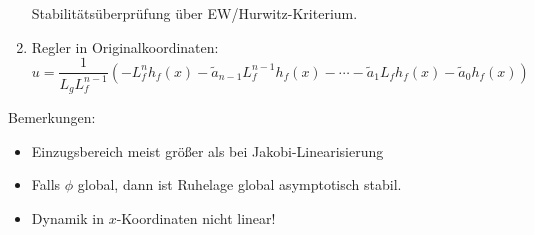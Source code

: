 \begin{enumerate}
        Stabilitätsüberprüfung über EW/Hurwitz-Kriterium.
    \item
        Regler in Originalkoordinaten:
        \begin{equation}
            u = \frac{1}{L_g L_f^{n-1}} (-L_f^n h_f(x) 
            - \tilde{a}_{n-1} L_f^{n-1} h_f(x) - \cdots - \tilde{a}_1 L_f h_f(x)
            - \tilde{a}_0 h_f(x))
        \end{equation}
\end{enumerate}

Bemerkungen:
\begin{itemize}
    \item
        Einzugsbereich meist größer als bei Jakobi-Linearisierung
    \item
        Falls $\phi$ global, dann ist Ruhelage global asymptotisch stabil.
    \item 
        Dynamik in $x$-Koordinaten nicht linear!
\end{itemize}
